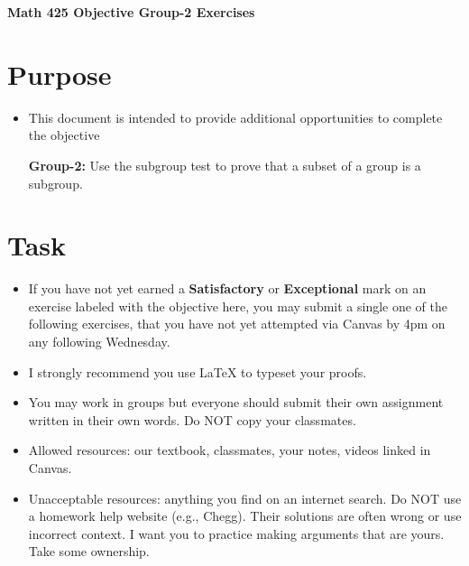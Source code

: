 \documentclass[12pt]{article}
\begin{document}
	\begin{center}
		{\Large \bf Math 425 Objective Group-2 Exercises}
	\end{center}
	\section*{Purpose}
	\begin{itemize}
		\item This document is intended to provide additional opportunities to complete the objective
		
		\textbf{Group-2:}  Use the subgroup test to prove that a subset of a group is a subgroup.
	\end{itemize}
	\section*{Task}
	\begin{itemize}
		\item If you have not yet earned a \textbf{Satisfactory} or \textbf{Exceptional} mark on an exercise labeled with the objective here, you may submit a single one of the following exercises, that you have not yet attempted via Canvas by 4pm on any following Wednesday.
		\item I strongly recommend you use LaTeX to typeset your proofs.
		\item You may work in groups but everyone should submit their own assignment written in their own words.  Do NOT copy your classmates.
		\item Allowed resources: our textbook, classmates, your notes, videos linked in Canvas.
		\item Unacceptable resources: anything you find on an internet search. Do NOT use a homework help website (e.g., Chegg). Their solutions are often wrong or use incorrect context.  I want you to practice making arguments that are yours. Take some ownership.
	\end{itemize}
\end{document}
